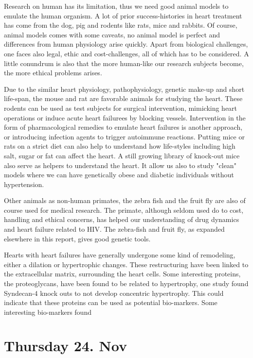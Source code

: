 \documentclass[12p]{article}
\begin{document}
Research on human has its limitation, thus we need good animal models to emulate the human organism.
A lot of prior success-histories in heart treatment has come from the dog, pig and rodents like rats, mice and rabbits.
Of course, animal models comes with some caveats, no animal model is perfect and differences from human physiology arise quickly.
Apart from biological challenges, one faces also legal, ethic and cost-challenges, all of which has to be considered.
A little conundrum is also that the more human-like our research subjects become, the more ethical problems arises.

Due to the similar heart physiology, pathophysiology, genetic make-up and short life-span, the mouse and rat are favorable animals for studying the heart.
These rodents can be used as test subjects for surgical intervention, mimicking heart operations or induce acute heart failurees by blocking vessels.
Intervention in the form of pharmacological remedies to emulate heart failures is another approach, or introducing infection agents to trigger autoimmune reactions.
Putting mice or rats on a strict diet can also help to understand how life-styles including high salt, sugar or fat can affect the heart.
A still growing library of knock-out mice also serve as helpers to understand the heart.
It allow us also to study "clean" models where we can have genetically obese and diabetic individuals without hypertension.

Other animals as non-human primates, the zebra fish and the fruit fly are also of course used for medical research.
The primate, although seldom used do to cost, handling and ethical concerns, has helped our understanding of drug dynamics and heart failure related to HIV.
The zebra-fish and fruit fly, as expanded elsewhere in this report, gives good genetic tools.

Hearts with heart failures have generally undergone some kind of remodeling, either a dilation or hypertrophic changes.
These restructuring have been linked to the extracellular matrix, surrounding the heart cells.
Some interesting proteins, the proteoglycans, have been found to be related to hypertrophy, one study found Syndecan-4 knock outs to not develop concentric hypertrophy.
This could indicate that these proteins can be used as potential bio-markers.
Some interesting bio-markers found 

\section*{Thursday 24. Nov}
\end{document}
